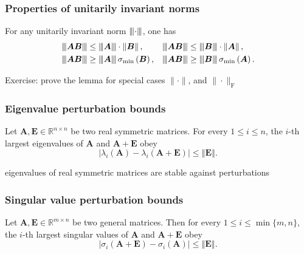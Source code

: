 \documentclass[compress,
mathserif,wide,%
]{beamer}
\begin{document}
\begin{frame}
	\frametitle{Properties of unitarily invariant norms}
\begin{lemma}
\label{prop:unitary_norm_relation}
For any unitarily invariant norm ${\left\vert\kern-0.25ex\left\vert\kern-0.25ex\left\vert \cdot \right\vert\kern-0.25ex\right\vert\kern-0.25ex\right\vert}$, one has 
%
\begin{align*}
\vertiii{\bm{A}\bm{B}} & \leq\vertiii{\bm{A}} \cdot  \left\Vert \bm{B}\right\Vert, &  & \vertiii{\bm{A}\bm{B}}\leq\vertiii{\bm{B}} \cdot \left\Vert \bm{A}\right\Vert,\\
\vertiii{\bm{A}\bm{B}} & \geq\vertiii{\bm{A}} \, \sigma_{\min}\left(\bm{B}\right), &  & \vertiii{\bm{A}\bm{B}}\geq\vertiii{\bm{B}} \, \sigma_{\min}\left(\bm{A}\right).
\end{align*}
%
\end{lemma}

\vfill
Exercise: prove the lemma for special cases $\|\cdot\|$, and $\|\cdot\|_{\mathrm{F}}$
\end{frame}

\begin{frame}
	\frametitle{Eigenvalue perturbation bounds}
	\begin{lemma}
\label{lemma:weyl}
Let $\bm{A},\bm{E}\in\mathbb{R}^{n\times n}$ be two real symmetric matrices.
	For every $1\leq i\leq n$, the $i$-th largest eigenvalues of $\bm{A}$ and $\bm{A}+\bm{E}$ obey
%
\begin{equation*}
	\left|\lambda_{i}\left(\bm{A}\right)-\lambda_{i}\left(\bm{A} +\bm{E}\right)\right|\leq\left\Vert \bm{E}\right\Vert .
\end{equation*}
%
\end{lemma}

\pause
\vfill
{

\begin{varblock}[\textwidth]{}
eigenvalues of real symmetric matrices are stable against perturbations
\end{varblock}
}



\end{frame}

\begin{frame}
	\frametitle{Singular value perturbation bounds}
	\begin{lemma}
\label{lemma:weyls-singular-value}
Let $\bm{A},\bm{E}\in\mathbb{R}^{m\times n}$ be two general matrices.
Then for every $1\leq i\leq \min\{m,n\}$, the $i$-th largest singular values of $\bm{A}$ and $\bm{A}+\bm{E}$ obey 
%
\[
	\left|\sigma_{i}\left(\bm{A}+\bm{E}\right)-\sigma_{i}\left(\bm{A}\right)\right|\leq\left\Vert \bm{E}\right\Vert .
\]
%
\end{lemma}
\end{frame}
\end{document}
